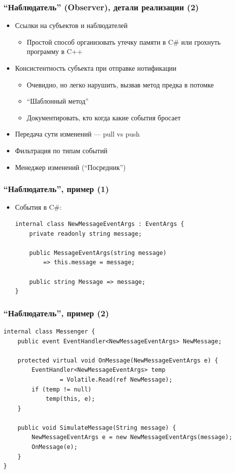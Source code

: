 \documentclass[xetex,mathserif,serif]{beamer}
\begin{document}
		\begin{frame}
		\frametitle{``Наблюдатель'' (Observer), детали реализации (2)}
		\begin{itemize}
			\item Ссылки на субъектов и наблюдателей
			\begin{itemize}
				\item Простой способ организовать утечку памяти в C\# или грохнуть программу в C++
			\end{itemize}
			\item Консистентность субъекта при отправке нотификации
			\begin{itemize}
				\item Очевидно, но легко нарушить, вызвав метод предка в потомке
				\item ``Шаблонный метод''
				\item Документировать, кто когда какие события бросает
			\end{itemize}
			\item Передача сути изменений --- pull vs push
			\item Фильтрация по типам событий
			\item Менеджер изменений (``Посредник'')
		\end{itemize}
	\end{frame}

	\begin{frame}[fragile]
		\frametitle{``Наблюдатель'', пример (1)}
		\begin{itemize}
			\item События в C\#:
			\begin{verbatim}
internal class NewMessageEventArgs : EventArgs {
    private readonly string message;

    public MessageEventArgs(string message) 
        => this.message = message;

    public string Message => message;
}
			\end{verbatim}
		\end{itemize}
\end{frame}

	\begin{frame}[fragile]
		\frametitle{``Наблюдатель'', пример (2)}
		\begin{small}
			\begin{verbatim}
internal class Messenger {
    public event EventHandler<NewMessageEventArgs> NewMessage;

    protected virtual void OnMessage(NewMessageEventArgs e) {
        EventHandler<NewMessageEventArgs> temp 
                = Volatile.Read(ref NewMessage);
        if (temp != null) 
            temp(this, e);
    }

    public void SimulateMessage(String message) {
        NewMessageEventArgs e = new NewMessageEventArgs(message);
        OnMessage(e);
    }
}
			\end{verbatim}
		\end{small}
	\end{frame}
\end{document}
